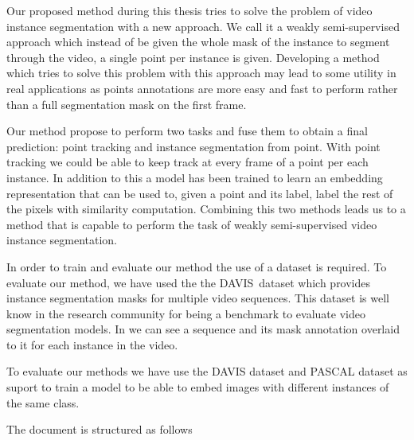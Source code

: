 Our proposed method during this thesis tries to solve the problem of video instance segmentation with a new approach.
We call it a weakly semi-supervised approach which instead of be given the whole mask of the instance to segment through the video, a single point per instance is given.
Developing a method which tries to solve this problem with this approach may lead to some utility in real applications as points annotations are more easy and fast to perform rather than a full segmentation mask on the first frame.

Our method propose to perform two tasks and fuse them to obtain a final prediction: point tracking and instance segmentation from point.
With point tracking we could be able to keep track at every frame of a point per each instance.
In addition to this a model has been trained to learn an embedding representation that can be used to, given a point and its label, label the rest of the pixels with similarity computation.
Combining this two methods leads us to a method that is capable to perform the task of weakly semi-supervised video instance segmentation.

In order to train and evaluate our method the use of a dataset is required.
To evaluate our method, we have used the the DAVIS~\citedavisboth dataset which provides instance segmentation masks for multiple video sequences.
This dataset is well know in the research community for being a benchmark to evaluate video segmentation models.
In  we can see a sequence and its mask annotation overlaid to it for each instance in the video.

\begin{figure}[h]
  \centering
  \caption{}
  \label{fig:intro:davis}
\end{figure}


To evaluate our methods we have use the DAVIS dataset and PASCAL dataset as suport to train a model to be able to embed images with different instances of the same class.

The document is structured as follows





